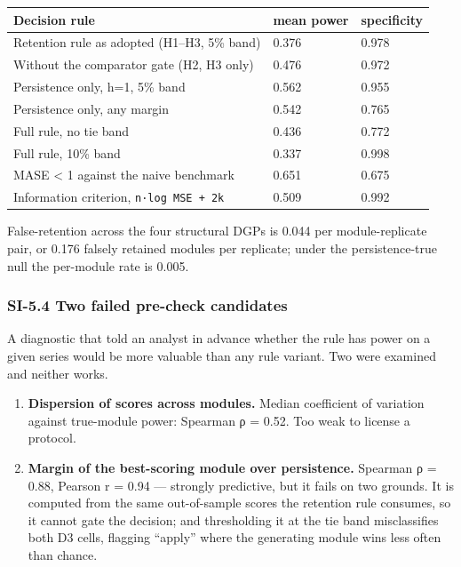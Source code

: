 \documentclass[11pt]{article}
\providecommand{\tightlist}{\setlength{\itemsep}{0.2em}\setlength{\parskip}{0pt}}
\begin{document}
{\def\LTcaptype{none} %
\begin{longtable}[]{@{}lll@{}}
\toprule\noalign{}
Decision rule & mean power & specificity \\
\midrule\noalign{}
\endhead
\bottomrule\noalign{}
\endlastfoot
Retention rule as adopted (H1--H3, 5\% band) & 0.376 & 0.978 \\
Without the comparator gate (H2, H3 only) & 0.476 & 0.972 \\
Persistence only, h=1, 5\% band & 0.562 & 0.955 \\
Persistence only, any margin & 0.542 & 0.765 \\
Full rule, no tie band & 0.436 & 0.772 \\
Full rule, 10\% band & 0.337 & 0.998 \\
MASE \textless{} 1 against the naive benchmark & 0.651 & 0.675 \\
Information criterion, \texttt{n·log\ MSE\ +\ 2k} & 0.509 & 0.992 \\
\end{longtable}
}

False-retention across the four structural DGPs is 0.044 per
module-replicate pair, or 0.176 falsely retained modules per replicate;
under the persistence-true null the per-module rate is 0.005.

\subsubsection{SI-5.4 Two failed pre-check
candidates}\label{si-5.4-two-failed-pre-check-candidates}

A diagnostic that told an analyst in advance whether the rule has power
on a given series would be more valuable than any rule variant. Two were
examined and neither works.

\begin{enumerate}
\def\labelenumi{\arabic{enumi}.}
\tightlist
\item
  \textbf{Dispersion of scores across modules.} Median coefficient of
  variation against true-module power: Spearman ρ = 0.52. Too weak to
  license a protocol.
\item
  \textbf{Margin of the best-scoring module over persistence.} Spearman
  ρ = 0.88, Pearson r = 0.94 --- strongly predictive, but it fails on
  two grounds. It is computed from the same out-of-sample scores the
  retention rule consumes, so it cannot gate the decision; and
  thresholding it at the tie band misclassifies both D3 cells, flagging
  ``apply'' where the generating module wins less often than chance.
\end{enumerate}
\end{document}
